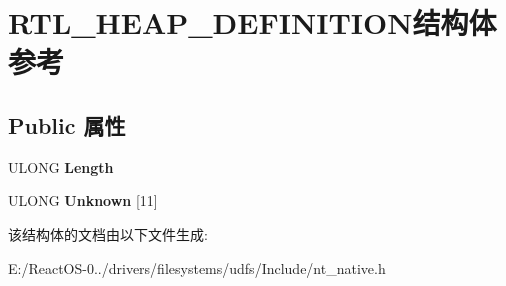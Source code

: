 \hypertarget{struct_r_t_l___h_e_a_p___d_e_f_i_n_i_t_i_o_n}{}\section{R\+T\+L\+\_\+\+H\+E\+A\+P\+\_\+\+D\+E\+F\+I\+N\+I\+T\+I\+O\+N结构体 参考}
\label{struct_r_t_l___h_e_a_p___d_e_f_i_n_i_t_i_o_n}
\subsection*{Public 属性}
\begin{DoxyCompactItemize}
\item 
\mbox{\label{struct_r_t_l___h_e_a_p___d_e_f_i_n_i_t_i_o_n_a4eeb20bbf9333f305187e0671a5b2f2f}} 
U\+L\+O\+NG {\bfseries Length}
\item 
\mbox{\label{struct_r_t_l___h_e_a_p___d_e_f_i_n_i_t_i_o_n_a34f6e59083cd5c15fd4c31625c3cb7f1}} 
U\+L\+O\+NG {\bfseries Unknown} \mbox{[}11\mbox{]}
\end{DoxyCompactItemize}


该结构体的文档由以下文件生成\+:\begin{DoxyCompactItemize}
\item 
E\+:/\+React\+O\+S-\/0../drivers/filesystems/udfs/\+Include/nt\+\_\+native.\+h\end{DoxyCompactItemize}
